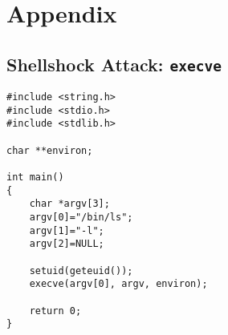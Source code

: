 \documentclass[a4paper,12pt]{article}
\begin{document}
\section{Appendix}
\subsection{Shellshock Attack: \texttt{execve}}
\begin{verbatim}
#include <string.h>
#include <stdio.h>
#include <stdlib.h>

char **environ;

int main()
{
    char *argv[3];
    argv[0]="/bin/ls";
    argv[1]="-l";
    argv[2]=NULL;

    setuid(geteuid());
    execve(argv[0], argv, environ);

    return 0;
}
\end{verbatim}
\end{document}
